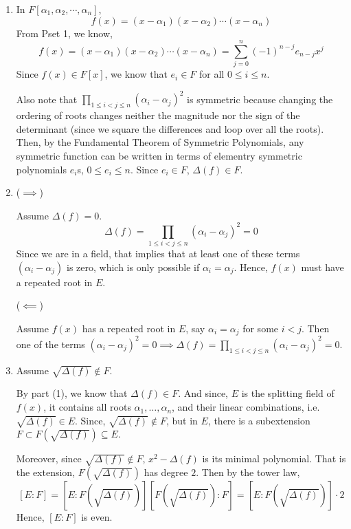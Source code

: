 \documentclass[12pt]{article}
\begin{document}
\begin{solution}
    \bbni

    \begin{enumerate}
        \item  In $F[\alpha_1, \alpha_2, \cdots, \alpha_n]$, 
        \[f(x) = (x-\alpha_1)(x-\alpha_2)\cdots(x-\alpha_n)\]
        From Pset 1, we know, 
        \[f(x) = (x-\alpha_1)(x-\alpha_2)\cdots(x-\alpha_n) = \sum_{j=0}^{n}(-1)^{n-j}e_{n-j}x^j\]
        Since $f(x) \in F[x]$, we know that $e_i \in F$ for all $0 \leq i \leq n$.

        Also note that $\prod_{1 \leq i < j \leq n} (\alpha_i-\alpha_j)^2$ is symmetric because changing the ordering of roots changes neither the magnitude nor the sign of the determinant (since we square the differences and loop over all the roots). Then, by the Fundamental Theorem of Symmetric Polynomials, any symmetric function can be written in terms of elementry symmetric polynomials $e_i$s, $0 \leq e_i \leq n$. Since $e_i \in F$, $\Delta(f) \in F$. 

        \item  ($\implies$)
        
        Assume $\Delta(f) = 0$. 
        \[ \Delta(f) = \prod_{1 \leq i < j \leq n} (\alpha_i-\alpha_j)^2 = 0\]
        Since we are in a field, that implies that at least one of these terms $(\alpha_i - \alpha_j)$ is zero, which is only possible if $\alpha_i = \alpha_j$. Hence, $f(x)$ must have a repeated root in $E$. 

        \bbni
        ($\impliedby$) 

        Assume $f(x)$ has a repeated root in $E$, say $\alpha_i =\alpha_j$ for some $i < j$. Then one of the terms $(\alpha_i - \alpha_j)^2 = 0 \implies \Delta(f) = \prod_{1 \leq i < j \leq n} (\alpha_i-\alpha_j)^2 = 0$. 

        \item Assume $\sqrt{\Delta(f)} \notin F$. 
        
        By part (1), we know that $\Delta(f) \in F$. And since, $E$ is the splitting field of $f(x)$, it contains all roots $\alpha_1, \ldots, \alpha_n$, and their linear combinations, i.e. $\sqrt{\Delta(f)} \in E$. Since, $\sqrt{\Delta(f)} \notin F$, but in $E$, there is a subextension $F \subset F(\sqrt{\Delta(f)}) \subseteq E$. 

        Moreover, since $\sqrt{\Delta(f)} \notin F$, $x^2 - {\Delta(f)}$ is its minimal polynomial. That is the extension, $F(\sqrt{\Delta(f)})$ has degree $2$. Then by the tower law, 
        \[[E:F] = [E:F(\sqrt{\Delta(f)})][F(\sqrt{\Delta(f)}): F] = [E:F(\sqrt{\Delta(f)})] \cdot 2\]
        Hence, $[E:F]$ is even. 
    \end{enumerate}
\end{solution}
\end{document}
